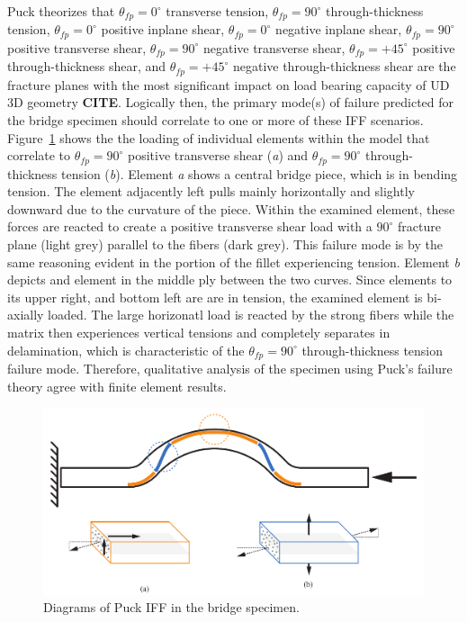 Puck theorizes that $\theta_{fp} = 0^{\circ}$ transverse tension, $\theta_{fp} = 90^{\circ}$ through-thickness tension, $\theta_{fp} = 0^{\circ}$ positive inplane shear, $\theta_{fp} = 0^{\circ}$ negative inplane shear, $\theta_{fp} = 90^{\circ}$ positive transverse shear, $\theta_{fp} = 90^{\circ}$ negative transverse shear, $\theta_{fp} = +45^{\circ}$ positive through-thickness shear, and $\theta_{fp} = +45^{\circ}$ negative through-thickness shear are the fracture planes with the most significant impact on load bearing capacity of UD 3D geometry \large{\textbf{CITE}}. Logically then, the primary mode(s) of failure predicted for the bridge specimen should correlate to one or more of these IFF scenarios. Figure~\ref{fig:puck-failure-qualitative} shows the the loading of individual elements within the model that correlate to $\theta_{fp} = 90^{\circ}$ positive transverse shear (\emph{a}) and $\theta_{fp} = 90^{\circ}$ through-thickness tension (\emph{b}). Element \emph{a} shows a central bridge piece, which is in bending tension. The element adjacently left pulls mainly horizontally and slightly downward due to the curvature of the piece. Within the examined element, these forces are reacted to create a positive transverse shear load with a $90^{\circ}$ fracture plane (light grey) parallel to the fibers (dark grey). This failure mode is by the same reasoning evident in the portion of the fillet experiencing tension. Element \emph{b} depicts and element in the middle ply between the two curves. Since elements to its upper right, and bottom left are are in tension, the examined element is bi-axially loaded. The large horizonatl load is reacted by the strong fibers while the matrix then experiences vertical tensions and completely separates in delamination, which is characteristic of the $\theta_{fp} = 90^{\circ}$ through-thickness tension failure mode. Therefore, qualitative analysis of the specimen using Puck's failure theory agree with finite element results.\\

\begin{figure}[htp]
\centering
\includegraphics[width=1\textwidth]{./figures/fea/puck-failure-qualitative}
\caption{Diagrams of Puck IFF in the bridge specimen.}
\label{fig:puck-failure-qualitative}
\end{figure}

